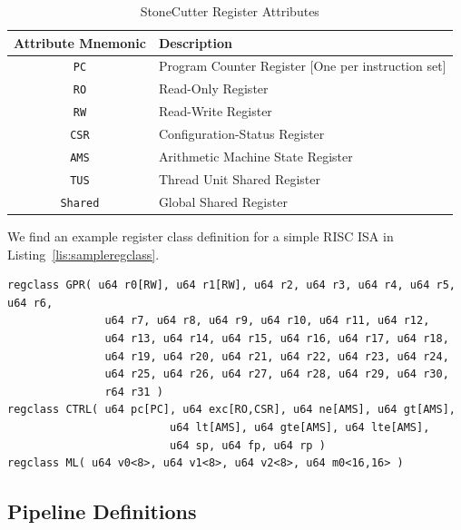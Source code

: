 \documentclass{article}
\begin{document}
\begin{table}[h]
\begin{center}
\caption{StoneCutter Register Attributes}
\vspace{0.125in}
\label{tab:regattrs}
\begin{tabular}{|c|l|}
\hline
\textbf{Attribute Mnemonic} & \textbf{Description}\\
\hline
\texttt{PC} & Program Counter Register [One per instruction set]\\
\hline
\texttt{RO} & Read-Only Register\\
\hline
\texttt{RW} & Read-Write Register\\
\hline
\texttt{CSR} & Configuration-Status Register\\
\hline
\texttt{AMS} & Arithmetic Machine State Register\\
\hline
\texttt{TUS} & Thread Unit Shared Register\\
\hline
\texttt{Shared} & Global Shared Register\\
\hline
\end{tabular}
\end{center}
\end{table}


\clearpage
We find an example register class definition for a simple RISC ISA in Listing~\ref{lis:sampleregclass}.  

\vspace{0.125in}
\begin{lstlisting}[frame=single,style=base,caption={Sample Register Class Definition},captionpos=b,label={lis:sampleregclass}]
regclass GPR( u64 r0[RW], u64 r1[RW], u64 r2, u64 r3, u64 r4, u64 r5, u64 r6, 
		       u64 r7, u64 r8, u64 r9, u64 r10, u64 r11, u64 r12, 
		       u64 r13, u64 r14, u64 r15, u64 r16, u64 r17, u64 r18,
		       u64 r19, u64 r20, u64 r21, u64 r22, u64 r23, u64 r24, 
		       u64 r25, u64 r26, u64 r27, u64 r28, u64 r29, u64 r30,
		       r64 r31 )
regclass CTRL( u64 pc[PC], u64 exc[RO,CSR], u64 ne[AMS], u64 gt[AMS],
                         u64 lt[AMS], u64 gte[AMS], u64 lte[AMS],
                         u64 sp, u64 fp, u64 rp )
regclass ML( u64 v0<8>, u64 v1<8>, u64 v2<8>, u64 m0<16,16> )
\end{lstlisting}

\clearpage
\subsection{Pipeline Definitions}
\label{sec:PipeDef}
\end{document}
